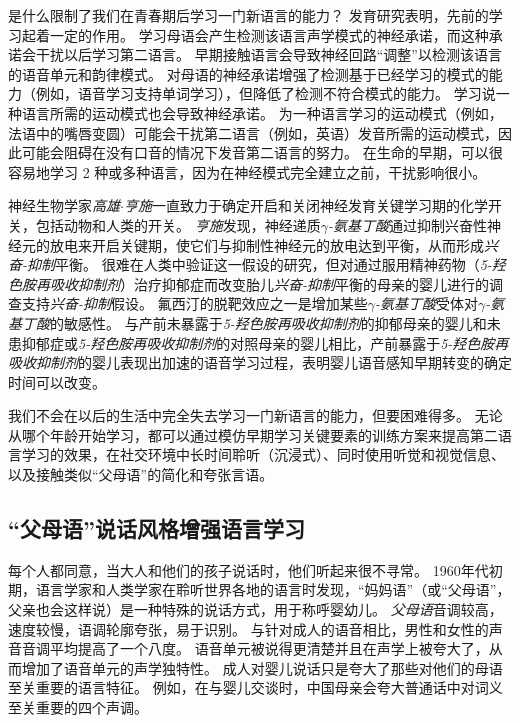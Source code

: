 是什么限制了我们在青春期后学习一门新语言的能力？
发育研究表明，先前的学习起着一定的作用。
学习母语会产生检测该语言声学模式的神经承诺，而这种承诺会干扰以后学习第二语言。
早期接触语言会导致神经回路“调整”以检测该语言的语音单元和韵律模式。
对母语的神经承诺增强了检测基于已经学习的模式的能力（例如，语音学习支持单词学习），但降低了检测不符合模式的能力。
学习说一种语言所需的运动模式也会导致神经承诺。
为一种语言学习的运动模式（例如，法语中的嘴唇变圆）可能会干扰第二语言（例如，英语）发音所需的运动模式，因此可能会阻碍在没有口音的情况下发音第二语言的努力。
在生命的早期，可以很容易地学习 2 种或多种语言，因为在神经模式完全建立之前，干扰影响很小。


神经生物学家\textit{高雄$\cdot$亨施}一直致力于确定开启和关闭神经发育关键学习期的化学开关，包括动物和人类的开关。
\textit{亨施}发现，神经递质\textit{$\gamma$-氨基丁酸}通过抑制兴奋性神经元的放电来开启关键期，使它们与抑制性神经元的放电达到平衡，从而形成\textit{兴奋-抑制}平衡。
很难在人类中验证这一假设的研究，但对通过服用精神药物（\textit{5-羟色胺再吸收抑制剂}）治疗抑郁症而改变胎儿\textit{兴奋-抑制}平衡的母亲的婴儿进行的调查支持\textit{兴奋-抑制}假设。
氟西汀的脱靶效应之一是增加某些\textit{$\gamma$-氨基丁酸}受体对\textit{$\gamma$-氨基丁酸}的敏感性。
与产前未暴露于\textit{5-羟色胺再吸收抑制剂}的抑郁母亲的婴儿和未患抑郁症或\textit{5-羟色胺再吸收抑制剂}的对照母亲的婴儿相比，产前暴露于\textit{5-羟色胺再吸收抑制剂}的婴儿表现出加速的语音学习过程，表明婴儿语音感知早期转变的确定时间可以改变。


我们不会在以后的生活中完全失去学习一门新语言的能力，但要困难得多。
无论从哪个年龄开始学习，都可以通过模仿早期学习关键要素的训练方案来提高第二语言学习的效果，在社交环境中长时间聆听（沉浸式）、同时使用听觉和视觉信息、以及接触类似“父母语”的简化和夸张言语。



\subsection{“父母语”说话风格增强语言学习}

每个人都同意，当大人和他们的孩子说话时，他们听起来很不寻常。
1960年代初期，语言学家和人类学家在聆听世界各地的语言时发现，“妈妈语”（或“父母语”，父亲也会这样说）是一种特殊的说话方式，用于称呼婴幼儿。
\textit{父母语}音调较高，速度较慢，语调轮廓夸张，易于识别。
与针对成人的语音相比，男性和女性的声音音调平均提高了一个八度。
语音单元被说得更清楚并且在声学上被夸大了，从而增加了语音单元的声学独特性。
成人对婴儿说话只是夸大了那些对他们的母语至关重要的语言特征。
例如，在与婴儿交谈时，中国母亲会夸大普通话中对词义至关重要的四个声调。


